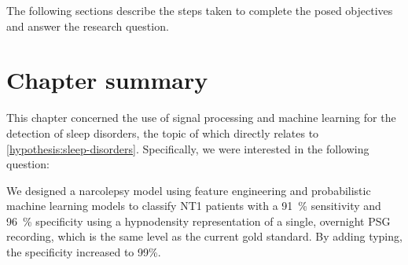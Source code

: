 The following sections describe the steps taken to complete the posed objectives and answer the research question.

\clearpage

\clearpage\section{Chapter summary}

This chapter%
\graffito{\ref{hypothesis:sleep-disorders}: \hypothesis\xspace sleep disorders} %
concerned the use of signal processing and machine learning for the detection of sleep disorders, the topic of which directly relates to \ref{hypothesis:sleep-disorders}.
Specifically, we were interested in the following question: \questionSleepDisorders\xspace 

We designed a narcolepsy model using feature engineering and probabilistic machine learning models to classify \ac{NT1} patients with a \SI{91}{\percent} sensitivity and \SI{96}{\percent} specificity using a hypnodensity representation of a single, overnight \ac{PSG} recording, which is the same level as the current gold standard. 
By adding \hla typing, the specificity increased to 99\%.